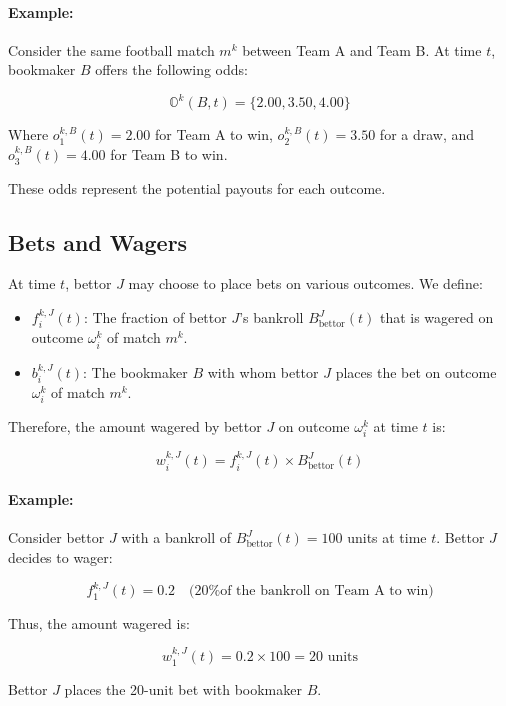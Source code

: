 \paragraph{Example:}
Consider the same football match \( m^k \) between Team A and Team B. At time \( t \), bookmaker \( B \) offers the following odds:

\[
\mathbb{O}^k(B, t) = \{ 2.00, 3.50, 4.00 \}
\]

Where \( o_1^{k,B}(t) = 2.00 \) for Team A to win, \( o_2^{k,B}(t) = 3.50 \) for a draw, and \( o_3^{k,B}(t) = 4.00 \) for Team B to win.

These odds represent the potential payouts for each outcome.

\subsection{Bets and Wagers}

At time \( t \), bettor \( J \) may choose to place bets on various outcomes. We define:

\begin{itemize}
    \item \( f_i^{k,J}(t) \): The fraction of bettor \( J \)'s bankroll \( B_{\text{bettor}}^J(t) \) that is wagered on outcome \( \omega_i^k \) of match \( m^k \).
    \item \( b_i^{k,J}(t) \): The bookmaker \( B \) with whom bettor \( J \) places the bet on outcome \( \omega_i^k \) of match \( m^k \).
\end{itemize}

Therefore, the amount wagered by bettor \( J \) on outcome \( \omega_i^k \) at time \( t \) is:

\[
w_i^{k,J}(t) = f_i^{k,J}(t) \times B_{\text{bettor}}^J(t)
\]


\paragraph{Example:}
Consider bettor \( J \) with a bankroll of \( B_{\text{bettor}}^J(t) = 100 \) units at time \( t \). Bettor \( J \) decides to wager:

\[
f_1^{k,J}(t) = 0.2 \quad \text{(20\% of the bankroll on Team A to win)}
\]

Thus, the amount wagered is:

\[
w_1^{k,J}(t) = 0.2 \times 100 = 20 \text{ units}
\] 

Bettor \( J \) places the 20-unit bet with bookmaker \( B \).

